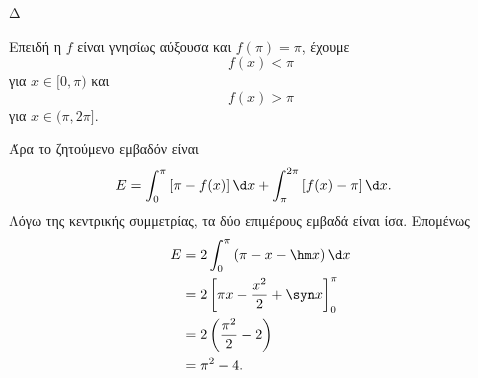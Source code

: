 \begin{thema}{Δ}
\begin{erwthma}
\item Επειδή η $f$ είναι γνησίως αύξουσα και $f(\pi)=\pi$, έχουμε
\[
f(x)<\pi
\]
για $x\in[0,\pi)$ και
\[
f(x)>\pi
\]
για $x\in(\pi,2\pi]$.

Άρα το ζητούμενο εμβαδόν είναι
\begin{align*}
E
&=\int_0^\pi\left[\pi-f(x)\right]\d x
+\int_\pi^{2\pi}\left[f(x)-\pi\right]\d x.
\end{align*}
Λόγω της κεντρικής συμμετρίας, τα δύο επιμέρους εμβαδά είναι ίσα. Επομένως
\begin{align*}
E
&=2\int_0^\pi\left(\pi-x-\hm x\right)\d x\\
&=2\left[\pi x-\frac{x^2}{2}+\syn x\right]_0^\pi\\
&=2\left(\frac{\pi^2}{2}-2\right)\\
&={\pi^2-4}.
\end{align*}
\end{erwthma}
\end{thema}

